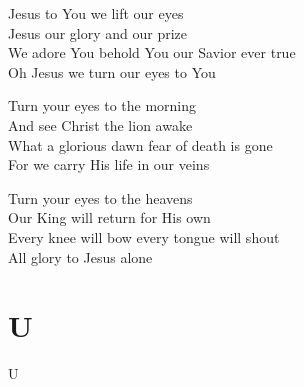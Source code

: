 \documentclass{beamer}
\begin{document}
{\begin{frame}{}
\end{frame}

\hypertarget{Turn your eyes upon Jesus[]C}{}
\begin{frame}{}
\fontsize{ 15 }{ 19 }\selectfont

Jesus to You we lift our eyes\\ 
Jesus our glory and our prize\\ 
We adore You behold You our Savior ever true\\ 
Oh Jesus we turn our eyes to You 

\end{frame}

\hypertarget{Turn your eyes upon Jesus[]3}{}
\begin{frame}{}
\fontsize{ 15 }{ 19 }\selectfont

Turn your eyes to the morning\\ 
And see Christ the lion awake\\ 
What a glorious dawn fear of death is gone\\ 
For we carry His life in our veins 

\end{frame}

\hypertarget{Turn your eyes upon Jesus[]4}{}
\begin{frame}{}
\fontsize{ 15 }{ 19 }\selectfont

Turn your eyes to the heavens\\ 
Our King will return for His own\\ 
Every knee will bow every tongue will shout\\ 
All glory to Jesus alone 

\end{frame}

}
\section{U}

\begin{frame}[t]{U}
\begin{columns}[t]

    


    


\end{columns}

\end{frame}
\end{document}
